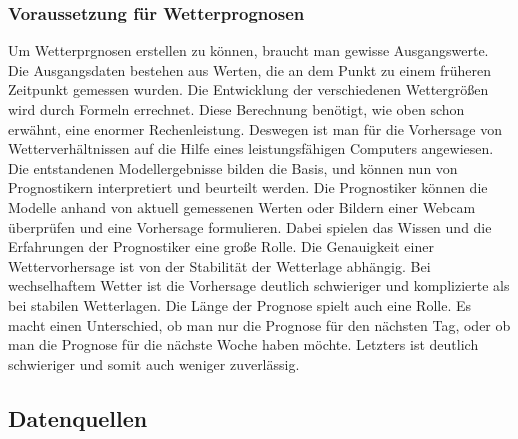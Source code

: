 \subsubsection{Voraussetzung für Wetterprognosen} %
Um Wetterprgnosen erstellen zu können, braucht man gewisse Ausgangswerte.
Die Ausgangsdaten bestehen aus Werten,
die an dem Punkt zu einem früheren Zeitpunkt gemessen wurden.
Die Entwicklung der verschiedenen Wettergrößen wird durch Formeln errechnet.
Diese Berechnung benötigt, wie oben schon erwähnt, eine enormer Rechenleistung.
Deswegen ist man für die Vorhersage von Wetterverhältnissen auf die Hilfe eines leistungsfähigen Computers angewiesen.
Die entstandenen Modellergebnisse bilden die Basis, und können nun von Prognostikern interpretiert und beurteilt werden.
Die Prognostiker können die Modelle anhand von aktuell gemessenen Werten oder Bildern einer Webcam überprüfen und eine Vorhersage formulieren.
Dabei spielen das Wissen und die Erfahrungen der Prognostiker eine große Rolle.
Die Genauigkeit einer Wettervorhersage ist von der Stabilität der Wetterlage abhängig.
Bei wechselhaftem Wetter ist die Vorhersage deutlich schwieriger und komplizierte als bei stabilen Wetterlagen.
Die Länge der Prognose spielt auch eine Rolle.
Es macht einen Unterschied,
ob man nur die Prognose für den nächsten Tag,
oder ob man die Prognose für die nächste Woche haben möchte.
Letzters ist deutlich schwieriger und somit auch weniger zuverlässig.

\subsection{Datenquellen} %

